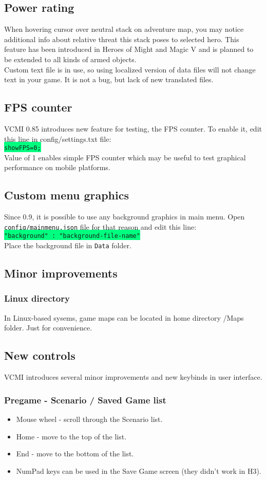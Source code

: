 \documentclass[a4size,final]{article}
\begin{document}
\subsection{Power rating}
When hovering cursor over neutral stack on adventure map, you may notice additional info about relative threat this stack poses to selected hero. This feature has been introduced in Heroes of Might and Magic V and is planned to be extended to all kinds of armed objects.\\
Custom text file is in use, so using localized version of data files will not change text in your game. It is not a bug, but lack of new translated files.
\subsection{FPS counter}
VCMI 0.85 introduces new feature for testing, the FPS counter. To enable it, edit this line in config/settings.txt file:\\
\colorbox{SpringGreen}{\texttt{showFPS=0;}}\\
Value of 1 enables simple FPS counter which may be useful to test graphical performance on mobile platforms.
\subsection{Custom menu graphics}
Since 0.9, it is possible to use any background graphics in main menu. Open \texttt{config/mainmenu.json} file for that reason and edit this line:\\
\colorbox{SpringGreen}{\texttt{"background" : "background-file-name"}}\\
Place the background file in \texttt{Data} folder.
\subsection{Minor improvements}
\subsubsection{Linux directory}
In Linux-based sysems, game maps can be located in home directory /Maps folder. Just for convenience.
\subsection{New controls}
VCMI introduces several minor improvements and new keybinds in user interface.
\subsubsection{Pregame - Scenario / Saved Game list}
\begin{itemize}
\item Mouse wheel - scroll through the Scenario list.
\item Home - move to the top of the list.
\item End - move to the bottom of the list.
\item NumPad keys can be used in the Save Game screen (they didn't work in H3).
\end{itemize}
\end{document}
